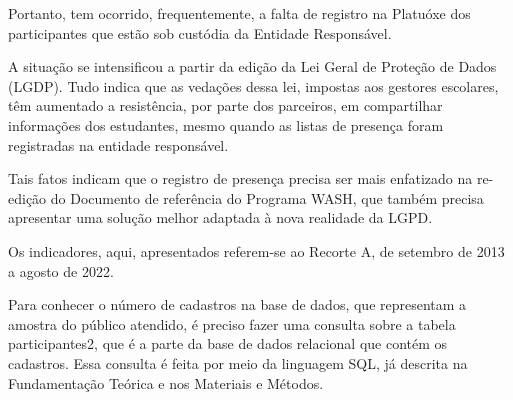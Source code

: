 \documentclass[
12pt,		%
openright,	%
twoside,  %
a4paper,			%
chapter=TITLE,		%
english,			%
french,				%
spanish,			%
brazil				%
]{USPSC-classe/USPSC}
\begin{document}
Portanto, tem ocorrido, frequentemente, a falta de registro na Platu\'oxe dos participantes que est\~ao sob cust\'odia da Entidade Respons\'avel.

















A situa\c{c}\~ao se intensificou a partir da edi\c{c}\~ao da Lei Geral de Prote\c{c}\~ao de Dados (LGDP). Tudo indica que as veda\c{c}\~oes dessa lei, impostas aos gestores escolares, t\^em aumentado a resist\^encia, por parte dos parceiros, em compartilhar informa\c{c}\~oes dos estudantes, mesmo quando as listas de presen\c{c}a foram registradas na entidade respons\'avel.

















Tais fatos indicam que o registro de presen\c{c}a precisa ser mais enfatizado na re-edi\c{c}\~ao do Documento de refer\^encia do Programa WASH, que tamb\'em precisa apresentar uma solu\c{c}\~ao melhor adaptada \`a nova realidade da LGPD.

















Os indicadores, aqui, apresentados referem-se ao Recorte A, de setembro de 2013 a agosto de 2022.

















Para conhecer o n\'umero de cadastros na base de dados, que representam a amostra do p\'ublico atendido, \'e preciso fazer uma consulta sobre a tabela \textquotedbl participantes2\textquotedbl , que \'e a parte da base de dados relacional que cont\'em os cadastros. Essa consulta \'e feita por meio da linguagem SQL, j\'a descrita na Fundamenta\c{c}\~ao Te\'orica e nos Materiais e M\'etodos.
\end{document}
